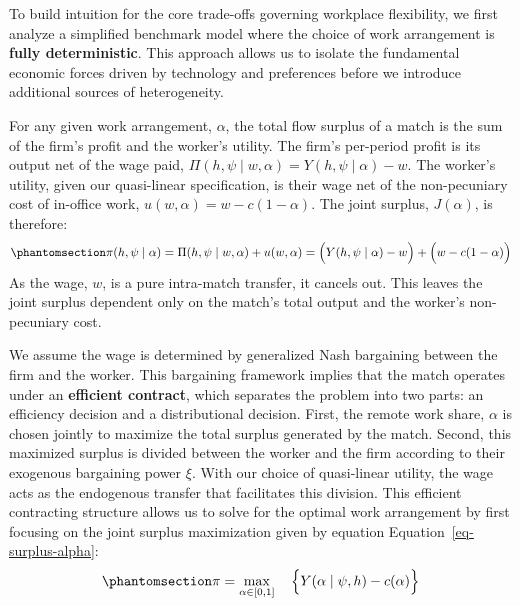 \documentclass[
  11pt,
  letterpaper,
  DIV=11,
  numbers=noendperiod]{scrartcl}
\begin{document}
To build intuition for the core trade-offs governing workplace
flexibility, we first analyze a simplified benchmark model where the
choice of work arrangement is \textbf{fully deterministic}. This
approach allows us to isolate the fundamental economic forces driven by
technology and preferences before we introduce additional sources of
heterogeneity.

For any given work arrangement, \(\alpha\), the total flow surplus of a
match is the sum of the firm's profit and the worker's utility. The
firm's per-period profit is its output net of the wage paid,
\(\Pi(h, \psi \mid w, \alpha)=Y(h, \psi\mid \alpha)−w\). The worker's
utility, given our quasi-linear specification, is their wage net of the
non-pecuniary cost of in-office work, \(u(w, \alpha)=w−c(1−\alpha)\).
The joint surplus, \(J(\alpha)\), is therefore:
\begin{equation}\phantomsection\label{eq-surplus-alpha}{\pi(h, \psi \mid \alpha) = \Pi(h, \psi \mid w, \alpha) +  u(w, \alpha )= \Big(Y(h, \psi \mid \alpha) - w\Big) + \Big(w - c(1-\alpha)\Big)}\end{equation}
As the wage, \(w\), is a pure intra-match transfer, it cancels out. This
leaves the joint surplus dependent only on the match's total output and
the worker's non-pecuniary cost.

We assume the wage is determined by generalized Nash bargaining between
the firm and the worker. This bargaining framework implies that the
match operates under an \textbf{efficient contract}, which separates the
problem into two parts: an efficiency decision and a distributional
decision. First, the remote work share, \(\alpha\) is chosen jointly to
maximize the total surplus generated by the match. Second, this
maximized surplus is divided between the worker and the firm according
to their exogenous bargaining power \(\xi\). With our choice of
quasi-linear utility, the wage acts as the endogenous transfer that
facilitates this division. This efficient contracting structure allows
us to solve for the optimal work arrangement by first focusing on the
joint surplus maximization given by equation
Equation~\ref{eq-surplus-alpha}:
\begin{equation}\phantomsection\label{eq-surplus-max}{\pi = \max_{\alpha \in [0,1]} \quad \Big\{ Y(\alpha \mid \psi, h) - c(\alpha)\Big\}}\end{equation}
\end{document}
